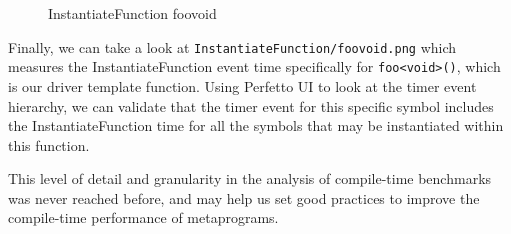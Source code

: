 \documentclass[../main]{subfiles}
\begin{document}
\begin{figure}[h]
\fontsize{8}{10}\selectfont

\caption{InstantiateFunction foovoid}
\end{figure}

Finally, we can take a look at \lstinline{InstantiateFunction/foovoid.png} which
measures the InstantiateFunction event time specifically for
\lstinline{foo<void>()}, which is our driver template function. Using Perfetto
UI to look at the timer event hierarchy, we can validate that the timer event
for this specific symbol includes the InstantiateFunction time for all the
symbols that may be instantiated within this function.

This level of detail and granularity in the analysis of compile-time benchmarks
was never reached before, and may help us set good practices to improve the
compile-time performance of metaprograms.
\end{document}
